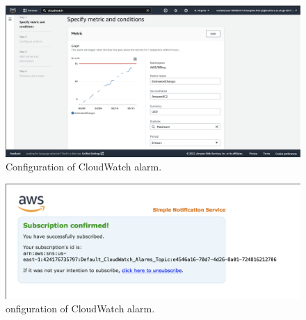 \begin{figure}[!htbp]
    \centering
    \includegraphics[width=\textwidth]{resources/cloudwatch/cloudwatch-charges-config-1}
    \caption{Configuration of CloudWatch alarm.}
    \label{fig:cloudwatch-sns-email}
\end{figure}

\begin{figure}[!htbp]
    \centering
    \includegraphics[width=\textwidth]{resources/cloudwatch/cloudwatch-alarm-success}
    \caption{onfiguration of CloudWatch alarm.}
    \label{fig:cloudwatch-sns-success}
\end{figure}









